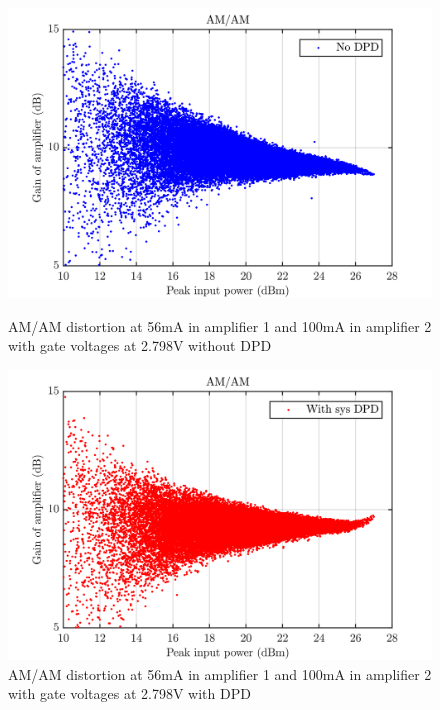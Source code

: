 \begin{figure}[H]
  \centering
  \begin{minipage}[b]{0.5\textwidth}
	\includegraphics[scale = 0.5]{figures/measurement/cree/meas5/amam_no_dpd_2p798v.png}
	\caption{AM/AM distortion at 56mA in amplifier 1 and 100mA in amplifier 2 with gate voltages at 2.798V without DPD}	
    \label{fig:meas5_1}
  \end{minipage}
  \hfill
  \begin{minipage}[b]{0.4\textwidth}
	\includegraphics[scale = 0.5]{figures/measurement/cree/meas5/amam_sys_dpd_2p798v.png}
	\caption{AM/AM distortion at 56mA in amplifier 1 and 100mA in amplifier 2 with gate voltages at 2.798V with DPD}
    \label{fig:meas5_1}
  \end{minipage}
\end{figure}
 
